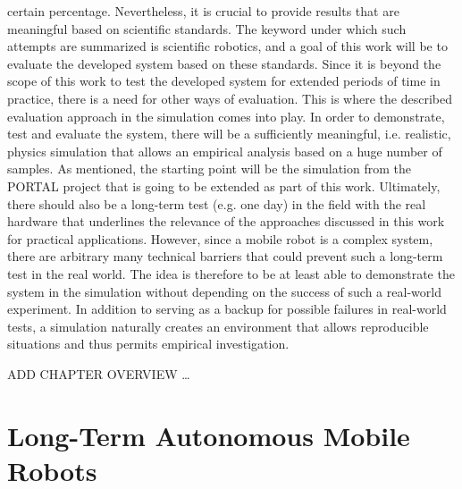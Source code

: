 \documentclass[english, master, utf8]{base/thesis_KBS}
\begin{document}
certain percentage. Nevertheless, it is crucial to provide results that are meaningful based on scientific standards. 
The keyword under which such attempts are summarized is scientific robotics, and a goal of this work will be to evaluate the developed system based on these standards.
Since it is beyond the scope of this work to test the developed system for extended periods of time in practice, there is a need for other ways of evaluation.
This is where the described evaluation approach in the simulation comes into play. In order to demonstrate, test and evaluate the system, there will be a sufficiently meaningful, 
i.e. realistic, physics simulation that allows an empirical analysis based on a huge number of samples. As mentioned, the starting point will be the simulation from the 
PORTAL project that is going to be extended as part of this work. Ultimately, there should also be a long-term test (e.g. one day) in the field with the real hardware that 
underlines the relevance of the approaches discussed in this work for practical applications. However, since a mobile robot is a complex system, there are arbitrary 
many technical barriers that could prevent such a long-term test in the real world. The idea is therefore to be at least able to demonstrate the system in the simulation
without depending on the success of such a real-world experiment. In addition to serving as a backup for possible failures in real-world tests,
a simulation naturally creates an environment that allows reproducible situations and thus permits empirical investigation.

ADD CHAPTER OVERVIEW \dots\newline

\chapter{Long-Term Autonomous Mobile Robots}
\end{document}
